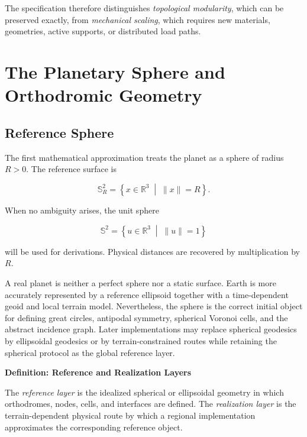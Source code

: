 \documentclass[11pt,fleqn]{book}
\numberwithin{equation}{chapter}
\newenvironment{definition}[1]
  {\begin{definitionEnv}
   \noindent\textbf{Definition: #1}\par\smallskip}
  {\end{definitionEnv}}
\theoremstyle{plain}
\theoremstyle{definition}
\theoremstyle{remark}
\newcommand{\Sphere}{\mathbb{S}^{2}}
\newcommand{\R}{\mathbb{R}}
\newcommand{\suchthat}{\;\middle|\;}
\begin{document}
The specification therefore distinguishes \emph{topological modularity}, which can be preserved exactly, from \emph{mechanical scaling}, which requires new materials, geometries, active supports, or distributed load paths.

\chapter{The Planetary Sphere and Orthodromic Geometry}

\section{Reference Sphere}

The first mathematical approximation treats the planet as a sphere of radius \(R>0\). The reference surface is

\begin{equation}
    \Sphere_R
    =
    \left\{
    x\in\R^3
    \suchthat
    \|x\|=R
    \right\}.
\end{equation}

When no ambiguity arises, the unit sphere

\begin{equation}
    \Sphere
    =
    \left\{
    u\in\R^3
    \suchthat
    \|u\|=1
    \right\}
\end{equation}

will be used for derivations. Physical distances are recovered by multiplication by \(R\).

A real planet is neither a perfect sphere nor a static surface. Earth is more accurately represented by a reference ellipsoid together with a time-dependent geoid and local terrain model. Nevertheless, the sphere is the correct initial object for defining great circles, antipodal symmetry, spherical Voronoi cells, and the abstract incidence graph. Later implementations may replace spherical geodesics by ellipsoidal geodesics or by terrain-constrained routes while retaining the spherical protocol as the global reference layer.

\begin{definition}{Reference and Realization Layers}
The \emph{reference layer} is the idealized spherical or ellipsoidal geometry in which orthodromes, nodes, cells, and interfaces are defined. The \emph{realization layer} is the terrain-dependent physical route by which a regional implementation approximates the corresponding reference object.
\end{definition}
\end{document}
